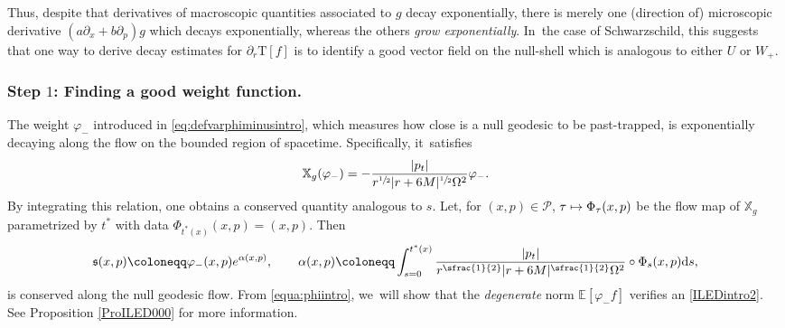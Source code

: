 \documentclass[JEP,XML,SOM,Unicode,published]{cedram}
\newcommand\mto{\mathchoice{\longmapsto}{\mapsto}{\mapsto}{\mapsto}}
\theoremstyle{plain}
\theoremstyle{definition}
\newcommand\T{{\mathbb{X}}}
\newcommand\dr{{\mathrm{d}}}
\begin{document}
Thus, despite that derivatives of macroscopic quantities associated to $g$ decay exponentially, there is merely one (direction of) microscopic derivative $(a\partial_x+b\partial_p)g$ which decays exponentially, whereas the others \emph{grow exponentially}. In~the case of Schwarzschild, this suggests that one way to derive decay estimates for $\partial_r \mathrm{T}[f]$ is to identify a good vector field on the null-shell which is analogous to either $U$ or $W_+$.

\subsubsection{Step $1$: Finding a good weight function.} The weight $\varphi_-$ introduced in \eqref{eq:defvarphiminusintro}, which measures how close is a null geodesic to be past-trapped, is exponentially decaying along the flow on the bounded region of spacetime. Specifically, it~satisfies
\begin{equation}\label{equa:phiintro}
\T_g (\varphi_-)=-\frac{|p_t|}{r^{\sfrac{1}{2}} |r+6M|^{\sfrac{1}{2}}\Omega^2} \varphi_-.
\end{equation}
By integrating this relation, one obtains a conserved quantity analogous to $s$. Let, for $(x,p) \in \mathcal{P}$, $\tau \mto \Phi_{\tau}(x,p)$ be the flow map of $\T_g$ parametrized by $t^*$ with data $\Phi_{t^*(x)}(x,p)=(x,p)$. Then
\[
\mathfrak{s}(x,p)\coloneqq \varphi_- (x,p) e^{\alpha(x,p)}, \qquad \alpha(x,p)\coloneqq \int_{s=0}^{t^*(x)} \frac{|p_t|}{r^{\sfrac{1}{2}} |r+6M|^{\sfrac{1}{2}}\Omega^2} \circ \Phi_{s}(x,p) \dr s,
\]
is conserved along the null geodesic flow. From \eqref{equa:phiintro}, we~will show that the \emph{degenerate} norm $\mathbb{E}[\varphi_- f]$ verifies an \eqref{ILEDintro2}. See Proposition \ref{ProILED000} for more information.
\end{document}
